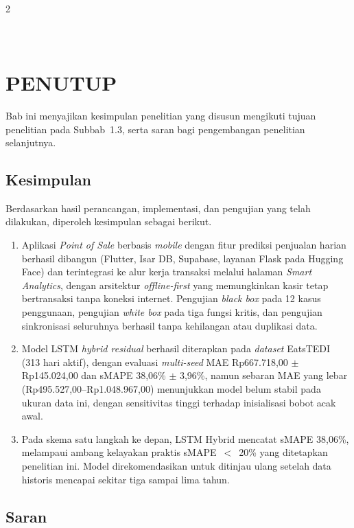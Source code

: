 \documentclass[12pt, a4paper, onecolumn, oneside]{report}
\begin{document}
\begin{spacing}{2}
\chapter[PENUTUP]{\\ PENUTUP}

Bab ini menyajikan kesimpulan penelitian yang disusun mengikuti tujuan penelitian pada Subbab~1.3, serta saran bagi pengembangan penelitian selanjutnya.

\section{Kesimpulan}

Berdasarkan hasil perancangan, implementasi, dan pengujian yang telah dilakukan, diperoleh kesimpulan sebagai berikut.
\begin{enumerate}
    \item Aplikasi \textit{Point of Sale} berbasis \textit{mobile} dengan fitur prediksi penjualan harian berhasil dibangun (Flutter, Isar DB, Supabase, layanan Flask pada Hugging Face) dan terintegrasi ke alur kerja transaksi melalui halaman \textit{Smart Analytics}, dengan arsitektur \textit{offline-first} yang memungkinkan kasir tetap bertransaksi tanpa koneksi internet. Pengujian \textit{black box} pada 12 kasus penggunaan, pengujian \textit{white box} pada tiga fungsi kritis, dan pengujian sinkronisasi seluruhnya berhasil tanpa kehilangan atau duplikasi data.

    \item Model LSTM \textit{hybrid residual} berhasil diterapkan pada \textit{dataset} EatsTEDI (313 hari aktif), dengan evaluasi \textit{multi-seed} MAE Rp667.718,00 $\pm$ Rp145.024,00 dan sMAPE 38,06\% $\pm$ 3,96\%, namun sebaran MAE yang lebar (Rp495.527,00--Rp1.048.967,00) menunjukkan model belum stabil pada ukuran data ini, dengan sensitivitas tinggi terhadap inisialisasi bobot acak awal.

    \item Pada skema satu langkah ke depan, LSTM Hybrid mencatat sMAPE 38,06\%, melampaui ambang kelayakan praktis sMAPE~$<$~20\% yang ditetapkan penelitian ini. Model direkomendasikan untuk ditinjau ulang setelah data historis mencapai sekitar tiga sampai lima tahun.
\end{enumerate}

\section{Saran}


\end{spacing}
\end{document}
